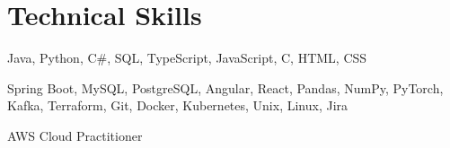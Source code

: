 \documentclass[letterpaper,11pt]{article}
\begin{document}
\section{Technical Skills}
 \begin{description}[leftmargin=!,labelwidth=\widthof{\small\textit{Programming Languages:XX}}, itemsep=0.5pt, parsep=0.5pt]
  \item[\small{Languages:}] \small Java, Python,  C\#, SQL, TypeScript, JavaScript, C, HTML, CSS
  \item[\small{Technologies \& Tools:}] \small Spring Boot, MySQL, PostgreSQL, Angular, React, Pandas, NumPy, PyTorch, Kafka, Terraform, Git, Docker, Kubernetes, Unix, Linux, Jira
  \item[\small{Certifications:}] \small AWS Cloud Practitioner
\end{description}
\vspace{-10pt}

\end{document}
